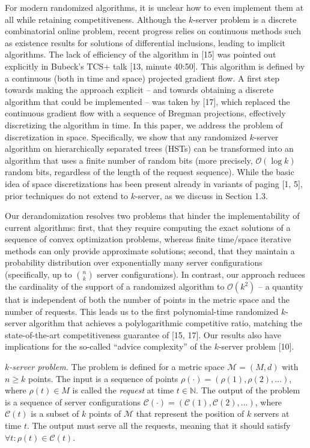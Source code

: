 \documentclass[10pt,a4paper]{article}
\begin{document}
For modern randomized algorithms, it is unclear how to even implement them at all while retaining competitiveness. Although the $k$-server problem is a discrete combinatorial online problem, recent progress relies on continuous methods such as existence results for solutions of differential inclusions, leading to implicit algorithms. The lack of efficiency of the algorithm in [15] was pointed out explicitly in Bubeck’s TCS+ talk [13, minute 40:50]. This algorithm is defined by a continuous (both in time and space) projected gradient flow. A first step towards making the approach explicit – and towards obtaining a discrete algorithm that could be implemented – was taken by [17], which replaced the continuous gradient flow with a sequence of Bregman projections, effectively discretizing the algorithm in time. In this paper, we address the problem of discretization in space.
Specifically, we show that any randomized $k$-server algorithm on hierarchically separated trees (HSTs) can be transformed into an algorithm that uses a finite number of random bits (more precisely, $\mathcal{O}(\log k)$ random bits, regardless of the length of the request sequence). While the basic idea of space discretizations has been present already in variants of paging [1, 5], prior techniques do not extend to $k$-server, as we discuss in Section 1.3.\par




Our derandomization resolves two problems that hinder the implementability of current algorithms: first, that they require computing the exact solutions of a sequence of convex optimization problems, whereas finite time/space iterative methods can only provide approximate solutions; second, that they maintain a probability distribution over exponentially many server configurations (specifically, up to $\binom{n}{k}$ server configurations). In contrast, our approach reduces the cardinality of the support of a randomized algorithm to $\mathcal{O}(k^{2})$ – a quantity that is independent of both the number of points in the metric space and the number of requests.
This leads us to the first polynomial-time randomized $k$-server algorithm that achieves a polylogarithmic competitive ratio, matching the state-of-the-art competitiveness guarantee of [15, 17]. Our results also have implications for the so-called “advice complexity” of the $k$-server problem [10].\par




$k$\emph{-server problem.} The problem is defined for a metric space $\mathcal{M}=(M,d)$ with $n\geq k$ points. The input is a sequence of points $\rho(\cdot)=(\rho(1),\rho(2),\dots)$, where $\rho(t)\in M$ is called the \emph{request} at time $t\in\mathbb{N}$. The output of the problem is a sequence of server configurations $\mathcal{C}(\cdot)=(\mathcal{C}(1),\mathcal{C}(2),\dots)$, where $\mathcal{C}(t)$ is a subset of $k$ points of $\mathcal{M}$ that represent the position of $k$ servers at time $t$. The output must serve all the requests, meaning that it should satisfy $\forall t\colon\rho(t)\in\mathcal{C}(t)$.\par
\end{document}
